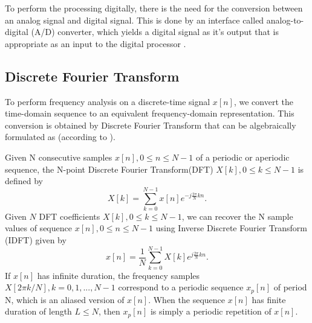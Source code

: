 \documentclass[twoside]{ctuthesis}
\theoremstyle{plain}
\theoremstyle{definition}
\theoremstyle{note}
\begin{document}
	To perform the processing digitally, there is the need for the conversion between an analog signal and digital signal. This is done by an interface called analog-to-digital (A/D) converter, which yields a digital signal as it's output that is appropriate as an input to the digital processor \cite{cite:2,cite:3}.
	
\subsection{Discrete Fourier Transform}
\label{sec:DiscreteFourierTransform}
To perform frequency analysis on a discrete-time signal ${x[n]}$, we convert the time-domain sequence to an equivalent frequency-domain representation. This conversion is obtained by Discrete Fourier Transform that can be algebraically formulated as (according to \cite{cite:2,cite:3}).
	
Given N consecutive samples $x[n], 0 \leq n \leq N-1$ of a periodic or aperiodic sequence, the N-point Discrete Fourier Transform(DFT) $X[k], 0 \leq k \leq N-1$ is defined by
\begin{equation} \label{eq:DFT}
X[k]=\sum_{k=0}^{N-1}x[n]e^{-j \frac{2 \pi}{N} kn}.
\end{equation}
Given $N$ DFT coefficients $X[k], 0 \leq k \leq N-1$, we can recover the N sample values of sequence $x[n], 0 \leq n \leq N-1$ using Inverse Discrete Fourier Transform (IDFT) given by
\begin{equation} \label{eq:IDFT}
x[n]=\frac{1}{N} \sum_{k=0}^{N-1}X[k]e^{j \frac{2 \pi}{N} kn}.
\end{equation}
If $x[n]$ has infinite duration, the frequency samples  $X[2 \pi k/ N], k=0, 1, ..., N-1$ correspond to a periodic sequence $x_{p}[n]$ of period N, which is an aliased version of $x[n]$. When the sequence $x[n]$ has finite duration of length $L \leq N$, then  $x_{p}[n]$ is simply a periodic repetition of $x[n]$.
\end{document}

